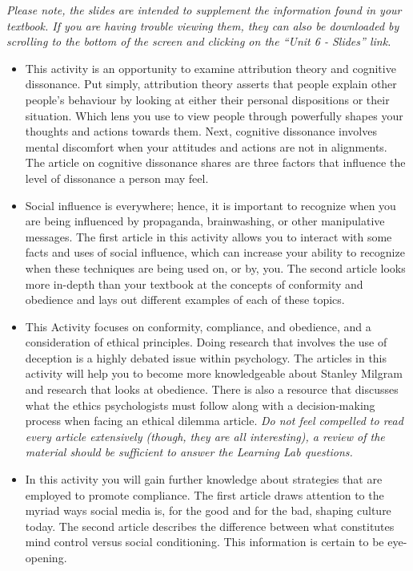 \documentclass[
]{book}
\providecommand{\tightlist}{%
  \setlength{\itemsep}{0pt}\setlength{\parskip}{0pt}}
\begin{document}
\begin{reflect}
\emph{Please note, the slides are intended to supplement the information found in your textbook. If you are having trouble viewing them, they can also be downloaded by scrolling to the bottom of the screen and clicking on the ``Unit 6 - Slides'' link.}

\begin{itemize}
\tightlist
\item
  This activity is an opportunity to examine attribution theory and cognitive dissonance. Put simply, attribution theory asserts that people explain other people's behaviour by looking at either their personal dispositions or their situation. Which lens you use to view people through powerfully shapes your thoughts and actions towards them. Next, cognitive dissonance involves mental discomfort when your attitudes and actions are not in alignments. The article on cognitive dissonance shares are three factors that influence the level of dissonance a person may feel.\\
\item
  Social influence is everywhere; hence, it is important to recognize when you are being influenced by propaganda, brainwashing, or other manipulative messages. The first article in this activity allows you to interact with some facts and uses of social influence, which can increase your ability to recognize when these techniques are being used on, or by, you. The second article looks more in-depth than your textbook at the concepts of conformity and obedience and lays out different examples of each of these topics.\\
\item
  This Activity focuses on conformity, compliance, and obedience, and a consideration of ethical principles. Doing research that involves the use of deception is a highly debated issue within psychology. The articles in this activity will help you to become more knowledgeable about Stanley Milgram and research that looks at obedience. There is also a resource that discusses what the ethics psychologists must follow along with a decision-making process when facing an ethical dilemma article. \emph{Do not feel compelled to read every article extensively (though, they are all interesting), a review of the material should be sufficient to answer the Learning Lab questions.}\\
\item
  In this activity you will gain further knowledge about strategies that are employed to promote compliance. The first article draws attention to the myriad ways social media is, for the good and for the bad, shaping culture today. The second article describes the difference between what constitutes mind control versus social conditioning. This information is certain to be eye-opening.
\end{itemize}


\end{reflect}
\end{document}
